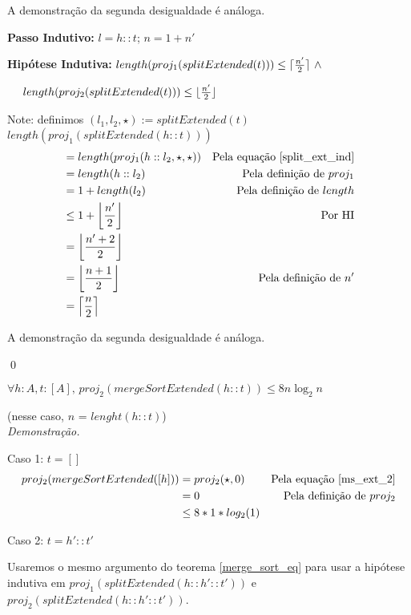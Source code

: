 \documentclass[12pt, oneside, a4paper,english,brazil]{abntex2}
\DeclarePairedDelimiter\floor{\lfloor}{\rfloor}
\DeclarePairedDelimiter\ceil{\lceil}{\rceil}
\begin{document}
A demonstra\c{c}\~ao da segunda desigualdade \'e an\'aloga.

\textbf{Passo Indutivo: } $l = h :: t$; $n = 1 + n'$

\textbf{Hip\'otese Indutiva: } $length(proj_{1}(splitExtended(t))) \le \ceil{\frac{n'}{2}} \,\, \wedge$

\qquad \qquad \qquad \qquad \quad \,\,\,\,\,\, $length(proj_{2}(splitExtended(t))) \le \floor{\frac{n'}{2}}$

Note: definimos $(l_{1}, l_{2}, \star) := splitExtended(t)$\\

$length(proj_{1}(splitExtended(h :: t)))$
\begin{align*}
  &= length(proj_{1}(h :: l_{2}, \star, \star)) &\text{Pela equa\c{c}\~ao \ref{split_ext_ind}}\\
  &= length(h :: l_{2}) &\text{Pela defini\c{c}\~ao de $proj_{1}$}\\
  &= 1 + length(l_{2}) &\text{Pela defini\c{c}\~ao de $length$}\\
  &\le 1 + \floor*{\frac{n'}{2}} &\text{Por HI}\\
  &= \floor*{\frac{n' + 2}{2}}\\
  &= \floor*{\frac{n + 1}{2}} &\text{Pela defini\c{c}\~ao de $n'$}\\
  &= \ceil*{\frac{n}{2}}
\end{align*}

A demonstra\c{c}\~ao da segunda desigualdade \'e an\'aloga.

\qed

\begin{teorema}
  $\forall h : A, t : [A], \, proj_{2}(mergeSortExtended(h :: t)) \le 8 n \log_{2}n$
\end{teorema}
(nesse caso, $n$ = $lenght(h :: t)$)\\

\noindent \textit{Demonstra\c{c}\~ao.}

Caso 1: $t = []$
\begin{align*}
  proj_{2}(mergeSortExtended([h])) &= proj_{2}(\star, 0) &\text{Pela equa\c{c}\~ao \ref{ms_ext_2}}\\
                                      &= 0 &\text{Pela defini\c{c}\~ao de $proj_{2}$}\\
  &\le 8 * 1 * log_{2}(1)
\end{align*}

Caso 2: $t = h' :: t'$

Usaremos o mesmo argumento do teorema \ref{merge_sort_eq} para usar a hip\'otese
indutiva em $proj_{1}(splitExtended(h :: h' :: t'))$ e
$proj_{2}(splitExtended(h :: h' :: t'))$.
\end{document}
